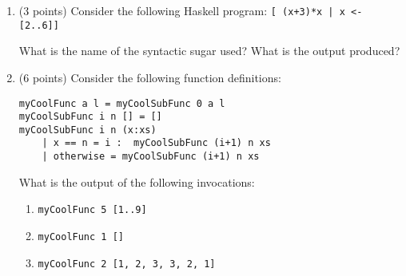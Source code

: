 
\begin{enumerate}
\item (3 points) Consider the following Haskell program: \texttt{[ (x+3)*x | x <- [2..6]]}

What is the name of the syntactic sugar used? %
What is the output produced? %


\vspace{5cm}


\item (6 points) Consider the following function definitions:
\begin{verbatim}
myCoolFunc a l = myCoolSubFunc 0 a l
myCoolSubFunc i n [] = []
myCoolSubFunc i n (x:xs)
    | x == n = i :  myCoolSubFunc (i+1) n xs
    | otherwise = myCoolSubFunc (i+1) n xs
\end{verbatim}
What is the output of the following invocations:
\begin{enumerate}
    \item \texttt{myCoolFunc 5 [1..9]}
    \item \texttt{myCoolFunc 1 []}
    \item \texttt{myCoolFunc 2 [1, 2, 3, 3, 2, 1]}
\end{enumerate}









\end{enumerate}


